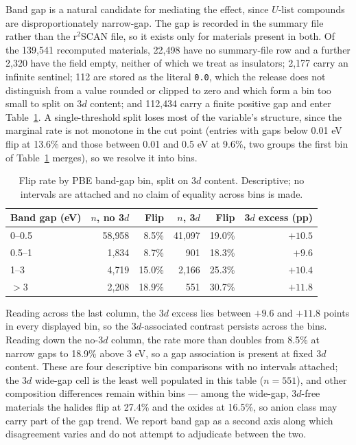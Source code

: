 \documentclass[11pt]{article}
\begin{document}
Band gap is a natural candidate for mediating the effect, since $U$-list compounds are
disproportionately narrow-gap. The gap is recorded in the summary file rather than the
r$^2$SCAN file, so it exists only for materials present in both. Of the 139{,}541
recomputed materials, 22{,}498 have no summary-file row and a further 2{,}320 have the
field empty, neither of which we treat as insulators; 2{,}177 carry an infinite sentinel;
112 are stored as the literal \texttt{0.0}, which the release does not distinguish from
a value rounded or clipped to zero and which form a bin too small to split on 3$d$
content; and 112{,}434 carry a finite positive gap and enter Table~\ref{tab:gap}. A
single-threshold split loses most of the variable's structure, since the marginal rate is
not monotone in the cut point (entries with gaps below 0.01 eV flip at 13.6\% and
those between 0.01 and 0.5 eV at 9.6\%, two groups the first bin of Table~\ref{tab:gap}
merges), so
we resolve it into bins.

\begin{table}[htbp]\centering
\caption{Flip rate by PBE band-gap bin, split on 3$d$ content. Descriptive; no intervals
are attached and no claim of equality across bins is made.}
\label{tab:gap}
\small\begin{tabular}{lrrrrr}
\toprule
Band gap (eV) & $n$, no 3$d$ & Flip & $n$, 3$d$ & Flip & 3$d$ excess (pp) \\
\midrule
0--0.5 & 58{,}958 & \phantom{0}8.5\% & 41{,}097 & 19.0\% & $+10.5$ \\
0.5--1 & \phantom{0}1{,}834 & \phantom{0}8.7\% & \phantom{0,}901 & 18.3\% & \phantom{0}$+9.6$ \\
1--3   & \phantom{0}4{,}719 & 15.0\% & \phantom{0}2{,}166 & 25.3\% & $+10.4$ \\
$>3$   & \phantom{0}2{,}208 & 18.9\% & \phantom{0,}551 & 30.7\% & $+11.8$ \\
\bottomrule
\end{tabular}
\end{table}

Reading across the last column, the 3$d$ excess lies between $+9.6$ and $+11.8$ points
in every displayed bin, so the 3$d$-associated contrast persists across the bins.
Reading down the no-3$d$ column, the rate more than doubles from 8.5\% at narrow gaps to
18.9\% above 3 eV, so a gap association is present at fixed 3$d$ content. These are four
descriptive bin comparisons with no intervals attached; the 3$d$ wide-gap cell is the least
well populated in this table ($n=551$), and other
composition differences remain within bins --- among the wide-gap, 3$d$-free materials the
halides flip at 27.4\% and the oxides at 16.5\%, so anion class may carry part of the
gap trend. We report band gap as a second axis along which
disagreement varies and do not attempt to adjudicate between the two.
\end{document}
